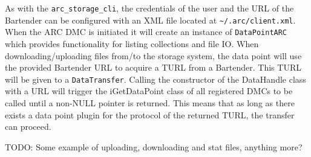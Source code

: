 \documentclass{book}
\begin{document}
As with the \verb!arc_storage_cli!, the credentials of the user and the URL of the Bartender can be configured with an XML file located at \verb!~/.arc/client.xml!. When the ARC DMC is initiated it will create an instance of \verb!DataPointARC! which provides functionality for listing collections and file IO. When downloading/uploading files from/to the storage system, the data point will use the provided Bartender URL to acquire a TURL from a Bartender. This TURL will be given to a \verb!DataTransfer!. Calling the constructor of the DataHandle class with a URL will trigger the iGetDataPoint class of all registered DMCs to be called until a non-NULL pointer is returned. This means that as long as there exists a data point plugin for the protocol of the returned TURL, the transfer can proceed.

TODO: Some example of uploading, downloading and stat files, anything more?




% 
\end{document}
